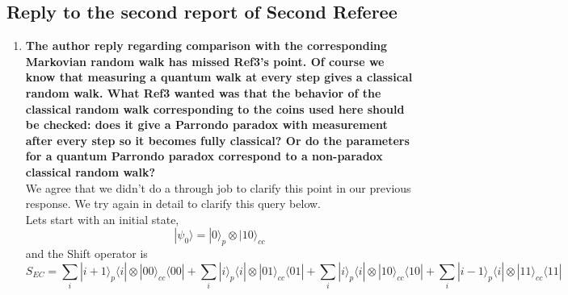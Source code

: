 \documentclass[12pt]{article}
\begin{document}
\subsection*{Reply to the second report of Second Referee}
\begin{enumerate}
\item \textbf{The author reply regarding comparison with the corresponding Markovian
random walk has missed Ref3's point. Of course we know that measuring
a quantum walk at every step gives a classical random walk. What Ref3
wanted was that the behavior of the classical random walk
corresponding to the coins used here should be checked: does it give a
Parrondo paradox with measurement after every step so it becomes fully
classical? Or do the parameters for a quantum Parrondo paradox
correspond to a non-paradox classical random walk?}\\

We agree that we didn't do a through job to clarify this point in our previous  response. We try again in detail to clarify this query below.\\
Lets start with an initial state, $$| \psi_0 \rangle= |0\rangle_p \otimes |10\rangle_{cc}$$
and the Shift operator is 
\begin{equation*}\label{shift_operator_two_spins}
S_{EC} =  \sum_i |i+1 \rangle_{p} \langle i| \otimes |00\rangle_{cc} \langle 00|  
+ \sum_i |i\rangle_{p} \langle i| \otimes |01\rangle_{cc} \langle 01| 
+ \sum_i |i\rangle_{p} \langle i| \otimes |10\rangle_{cc} \langle 10|
+ \sum_i |i-1 \rangle_{p} \langle i| \otimes |11\rangle_{cc} \langle 11|
\end{equation*}


\end{enumerate}
\end{document}
